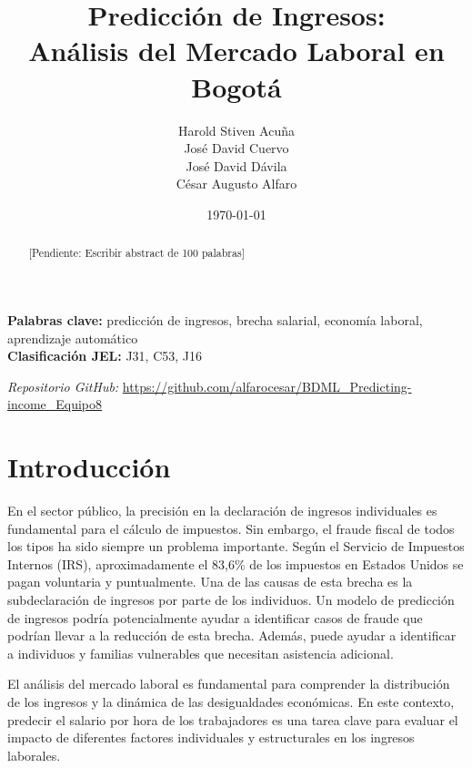 \documentclass[12pt,a4paper,onecolumn]{article}
\title{Predicción de Ingresos: \\ Análisis del Mercado Laboral en Bogotá}
\author{%
\begin{center}
Harold Stiven Acuña\\
José David Cuervo\\
José David Dávila\\
César Augusto Alfaro
\end{center}%
}
\date{\today}
\begin{document}
\maketitle
\thispagestyle{empty}


\begin{abstract}
[Pendiente: Escribir abstract de 100 palabras]
\end{abstract}

\medskip

\begin{flushleft}
    {\bf Palabras clave:} predicción de ingresos, brecha salarial, economía laboral, aprendizaje automático \\
    {\bf Clasificación JEL:} J31, C53, J16
\end{flushleft}

\begin{center}
    \textit{Repositorio GitHub:} \url{https://github.com/alfarocesar/BDML_Predicting-income_Equipo8}
\end{center}

\pagebreak
\doublespacing


\section{Introducción}
En el sector público, la precisión en la declaración de ingresos individuales es fundamental para el cálculo de impuestos. Sin embargo, el fraude fiscal de todos los tipos ha sido siempre un problema importante. Según el Servicio de Impuestos Internos (IRS), aproximadamente el 83,6\% de los impuestos en Estados Unidos se pagan voluntaria y puntualmente. Una de las causas de esta brecha es la subdeclaración de ingresos por parte de los individuos. Un modelo de predicción de ingresos podría potencialmente ayudar a identificar casos de fraude que podrían llevar a la reducción de esta brecha. Además, puede ayudar a identificar a individuos y familias vulnerables que necesitan asistencia adicional.

El análisis del mercado laboral es fundamental para comprender la distribución de los ingresos y la dinámica de las desigualdades económicas. En este contexto, predecir el salario por hora de los trabajadores es una tarea clave para evaluar el impacto de diferentes factores individuales y estructurales en los ingresos laborales.
\end{document}
